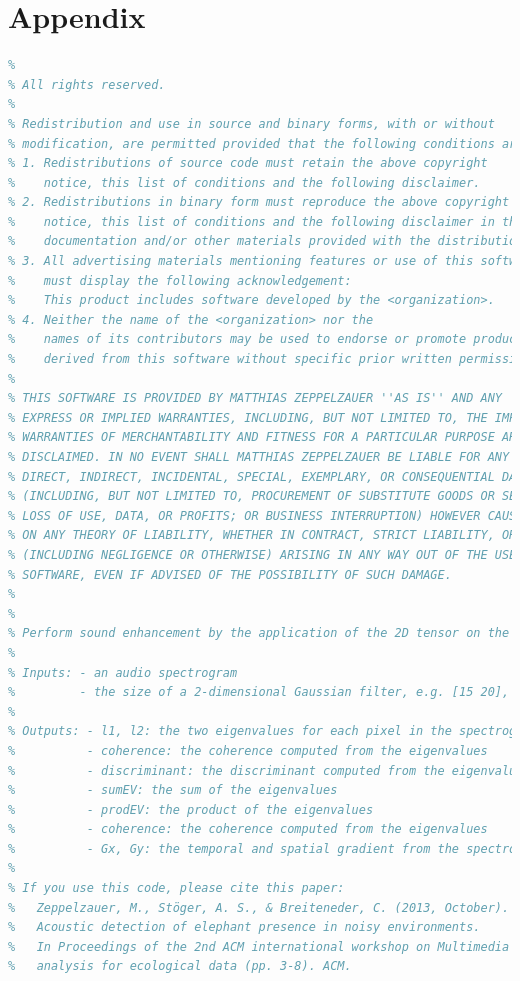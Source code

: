\documentclass[12pt]{article}
\numberwithin{figure}{section}
\numberwithin{table}{section}
\begin{document}
\newpage
\appendix
\section{Appendix}
\begin{lstlisting}[language=Matlab]
% Copyright (c) 2016, Matthias Zeppelzauer
% 
% All rights reserved.
% 
% Redistribution and use in source and binary forms, with or without
% modification, are permitted provided that the following conditions are met:
% 1. Redistributions of source code must retain the above copyright
%    notice, this list of conditions and the following disclaimer.
% 2. Redistributions in binary form must reproduce the above copyright
%    notice, this list of conditions and the following disclaimer in the
%    documentation and/or other materials provided with the distribution.
% 3. All advertising materials mentioning features or use of this software
%    must display the following acknowledgement:
%    This product includes software developed by the <organization>.
% 4. Neither the name of the <organization> nor the
%    names of its contributors may be used to endorse or promote products
%    derived from this software without specific prior written permission.
% 
% THIS SOFTWARE IS PROVIDED BY MATTHIAS ZEPPELZAUER ''AS IS'' AND ANY
% EXPRESS OR IMPLIED WARRANTIES, INCLUDING, BUT NOT LIMITED TO, THE IMPLIED
% WARRANTIES OF MERCHANTABILITY AND FITNESS FOR A PARTICULAR PURPOSE ARE
% DISCLAIMED. IN NO EVENT SHALL MATTHIAS ZEPPELZAUER BE LIABLE FOR ANY
% DIRECT, INDIRECT, INCIDENTAL, SPECIAL, EXEMPLARY, OR CONSEQUENTIAL DAMAGES
% (INCLUDING, BUT NOT LIMITED TO, PROCUREMENT OF SUBSTITUTE GOODS OR SERVICES;
% LOSS OF USE, DATA, OR PROFITS; OR BUSINESS INTERRUPTION) HOWEVER CAUSED AND
% ON ANY THEORY OF LIABILITY, WHETHER IN CONTRACT, STRICT LIABILITY, OR TORT
% (INCLUDING NEGLIGENCE OR OTHERWISE) ARISING IN ANY WAY OUT OF THE USE OF THIS
% SOFTWARE, EVEN IF ADVISED OF THE POSSIBILITY OF SUCH DAMAGE.
% 
% 
% Perform sound enhancement by the application of the 2D tensor on the spectrogram
%
% Inputs: - an audio spectrogram
% 		  - the size of a 2-dimensional Gaussian filter, e.g. [15 20], to smooth the output
%
% Outputs: - l1, l2: the two eigenvalues for each pixel in the spectrogram
%		   - coherence: the coherence computed from the eigenvalues  
%		   - discriminant: the discriminant computed from the eigenvalues 
%		   - sumEV: the sum of the eigenvalues 
%		   - prodEV: the product of the eigenvalues 
%		   - coherence: the coherence computed from the eigenvalues  	
%		   - Gx, Gy: the temporal and spatial gradient from the spectrogram (for each pixel) 		
%
% If you use this code, please cite this paper:
% 	Zeppelzauer, M., Stöger, A. S., & Breiteneder, C. (2013, October). 
% 	Acoustic detection of elephant presence in noisy environments. 
% 	In Proceedings of the 2nd ACM international workshop on Multimedia 
% 	analysis for ecological data (pp. 3-8). ACM.



\end{lstlisting}
\end{document}
